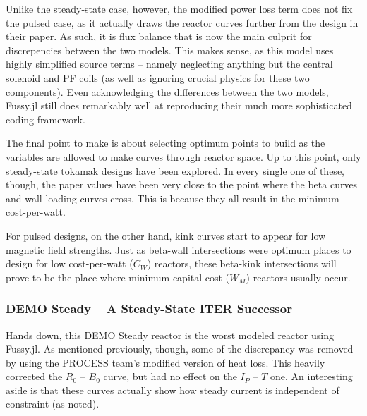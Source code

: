 Unlike the steady-state case, however, the modified power loss term does not fix the pulsed case, as it actually draws the reactor curves further from the design in their paper. As such, it is flux balance that is now the main culprit for discrepencies between the two models. This makes sense, as this model uses highly simplified source terms -- namely neglecting anything but the central solenoid and PF coils (as well as ignoring crucial physics for these two components). Even acknowledging the differences between the two models, Fussy.jl still does remarkably well at reproducing their much more sophisticated coding framework. 

The final point to make is about selecting optimum points to build as the  variables are allowed to make curves through reactor space. Up to this point, only steady-state tokamak designs have been explored. In every single one of these, though, the paper values have been very close to the point where the beta curves and wall loading curves cross. This is because they all result in the minimum cost-per-watt. 

For pulsed designs, on the other hand, kink curves start to appear for low magnetic field strengths. Just as beta-wall intersections were optimum places to design for low cost-per-watt ($C_W$) reactors, these beta-kink intersections will prove to be the place where minimum capital cost ($W_M$) reactors usually occur.

\newpage 

\subsubsection{DEMO Steady -- A Steady-State ITER Successor}

Hands down, this DEMO Steady reactor is the worst modeled reactor using Fussy.jl. As mentioned previously, though, some of the discrepancy was removed by using the PROCESS team's modified version of heat loss. This heavily corrected the $R_0$ -- $B_0$ curve, but had no effect on the $I_P$ -- $\overline T$ one. An interesting aside is that these curves actually show how steady current is independent of  constraint (as noted).

